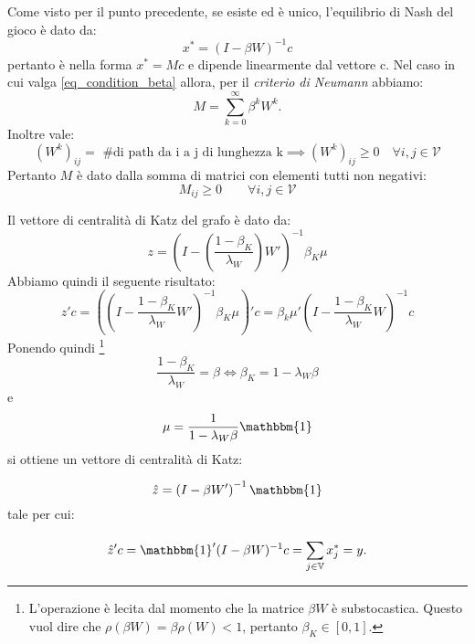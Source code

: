 \begin{alphaparts}
    \questionpart
    Come visto per il punto precedente, se esiste ed è unico, l'equilibrio di Nash del gioco è dato da:
    \[
        x^* = (I -\beta W)^{-1} c
        \]
    pertanto è nella forma \(x^* = Mc\) e dipende linearmente dal vettore c. Nel caso in cui valga \ref{eq_condition_beta} allora, per il \textit{criterio di Neumann} abbiamo:
    \begin{equation} \label{eq_neumann}
        M =  \sum \limits_{k=0}^{\infty} \beta^k W^k
    .\end{equation}
    Inoltre vale:
    \begin{equation*}
        (W^k)_{ij} = \text{ \# di path da i a j di lunghezza k} \implies (W^k)_{ij} \geq 0 \quad \forall i, j \in \mathcal{V}
    \end{equation*}
    Pertanto \(M\) è dato dalla somma di matrici con elementi tutti non negativi:
    \[M_{ij} \geq 0 \quad \quad \forall i, j \in \mathcal{V}\]

    \questionpart
    Il vettore di centralità di Katz del grafo è dato da:
    \begin{equation*}
        z = \left(I - \left(\frac{1-\beta_K}{\lambda_W}\right)W'\right)^{-1}\beta_K \mu
    \end{equation*}
    Abbiamo quindi il seguente risultato:
    \[
    z'c = \left(\left(I - \frac{1 - \beta_K}{\lambda_W}W'\right)^{-1} \beta_K \mu\right)' c = \beta_k \mu' \left(I - \frac{1 - \beta_K}{\lambda_W}W\right)^{-1}c    
    \]
    Ponendo quindi \footnote{L'operazione è lecita dal momento che  la matrice \(\beta W\) è substocastica. Questo vuol dire che \(\rho(\beta W) = \beta \rho(W) < 1\), pertanto \(\beta_K \in [0,1]\).}
    \[ \frac{1 - \beta_K}{\lambda_W} = \beta \iff \beta_K = 1 - \lambda_W \beta \]
    e
    \[\mu = \frac{1}{1 - \lambda_W \beta} \mathbbm{1}\]
    si ottiene un vettore di centralità di Katz:
    
    \begin{equation}\label{eq_zhat}
        \hat{z} =\left(I - \beta W'\right)^{-1}\mathbbm{1}
    \end{equation}
    tale per cui:
    
    \begin{equation}\label{eq_yscalar}
        \hat{z}'c = \mathbbm{1}' (I - \beta W)^{-1} c =  \sum \limits_{j \in \mathbb{V}}^{} x^*_j = y.
    \end{equation}


\end{alphaparts}
